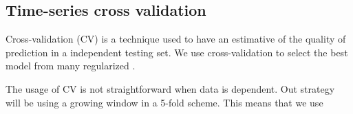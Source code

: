 
\subsection{Time-series cross validation}


Cross-validation (CV) is a technique used to have an estimative of the quality of prediction in a independent testing set. We use cross-validation to select the best model from many regularized .

The usage of CV is not straightforward when data is dependent. Out strategy will be using a growing window in a 5-fold scheme. This means that we use 